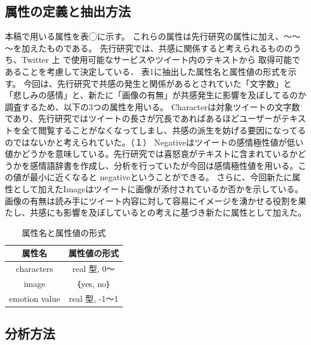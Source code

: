 \documentclass[dvipdfmx]{issj}
\begin{document}
\subsection{属性の定義と抽出方法}  %
本稿で用いる属性を表◯に示す。
これらの属性は先行研究の属性に加え、～～～を加えたものである。
先行研究では、共感に関係すると考えられるもののうち、Twitter 上 で使用可能なサービスやツイート内のテキストから 取得可能であることを考慮して決定している．
表1に抽出した属性名と属性値の形式を示す。
今回は、先行研究で共感の発生と関係があるとされていた「文字数」と「悲しみの感情」と、新たに「画像の有無」が共感発生に影響を及ぼしてるのか調査するため、以下の3つの属性を用いる。
Characterは対象ツイートの文字数であり、先行研究ではツイートの長さが冗長であればあるほどユーザーがテキストを全て閲覧することがなくなってしまし、共感の派生を妨げる要因になってるのではないかと考えられていた。（１）
Negativeはツイートの感情極性値が低い値かどうかを意味している。先行研究では喜怒哀がテキストに含まれているかどうかを感情語辞書を作成し、分析を行っていたが今回は感情極性値を用いる。この値が最小に近くなると negativeということができる。
さらに、今回新たに属性として加えたImageはツイートに画像が添付されているか否かを示している。画像の有無は読み手にツイート内容に対して容易にイメージを湧かせる役割を果たし、共感にも影響を及ぼしているとの考えに基づき新たに属性として加えた。



\begin{table}[htbp]\centering
\caption{属性名と属性値の形式}\label{tbl:font}
\begin{small}
\begin{tabular}{|c|c|} \hline
属性名            & 属性値の形式\\\hline\hline
characters         & real 型, 0～\\\hline
image & ｛yes, no｝\\\hline
emotion value     &  real 型, -1～1\\\hline
\end{tabular}
\end{small}
\end{table}








\subsection{分析方法}  %
\end{document}
